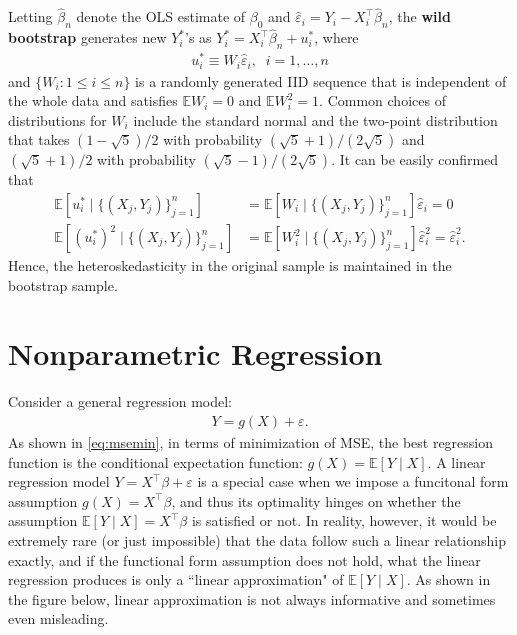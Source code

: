 \documentclass[10.5pt, A4paper, openany, uplatex]{book}
\newcommand{\eps}{\varepsilon}
\newcommand{\E}{\mathbb{E}}
\renewcommand{\hat}{\widehat}
\numberwithin{equation}{section}
\begin{document}
Letting $\hat \beta_n$ denote the OLS estimate of $\beta_0$ and $\hat \eps_i = Y_i - X_i^\top \hat \beta_n$, the \textbf{wild bootstrap} generates new $Y_i^*$'s as $Y_i^* = X_i^\top \hat \beta_n + u_i^*$, where
\begin{align*}
	u_i^* \equiv W_i \hat \eps_i, \;\; i = 1, \ldots, n
\end{align*}
and $\{W_i: 1 \le i \le n\}$ is a randomly generated IID sequence that is independent of the whole data and satisfies $\E W_i = 0$ and $\E W_i^2 = 1$.
Common choices of distributions for $W_i$ include the standard normal and the two-point distribution that takes $(1 - \sqrt{5})/2$ with probability $(\sqrt{5} + 1)/(2 \sqrt{5})$ and $(\sqrt{5} + 1)/2$ with probability $(\sqrt{5} - 1)/(2 \sqrt{5})$.
It can be easily confirmed that
\begin{align*}
	\E [u_i^* \mid \{(X_j, Y_j)\}_{j=1}^n] 
	& = \E [W_i \mid \{(X_j, Y_j)\}_{j=1}^n]  \hat \eps_i = 0 \\
	\E [(u_i^*)^2 \mid \{(X_j, Y_j)\}_{j=1}^n] 
	& = \E [W_i^2  \mid \{(X_j, Y_j)\}_{j=1}^n]  \hat \eps_i^2 =  \hat \eps_i^2.
\end{align*}
Hence, the heteroskedasticity in the original sample is maintained in the bootstrap sample.


\chapter{Nonparametric Regression}\label{chap:nonpara}

Consider a general regression model: 
\begin{align*}
	Y = g(X) + \eps.
\end{align*}
As shown in \eqref{eq:msemin}, in terms of minimization of MSE, the best regression function is the conditional expectation function: $g(X) = \E[Y \mid X]$.
A linear regression model $Y = X^\top\beta + \eps$ is a special case when we impose a funcitonal form  assumption $g(X) = X^\top \beta$, and thus its optimality hinges on whether the assumption $\E[Y \mid X] = X^\top\beta$ is satisfied or not.
In reality, however, it would be extremely rare (or just impossible) that the data follow such a linear relationship exactly, and if the functional form assumption does not hold, what the linear regression produces is only a ``linear approximation" of $\E[Y \mid X]$.
As shown in the figure below, linear approximation is not always informative and sometimes even misleading.
\end{document}
